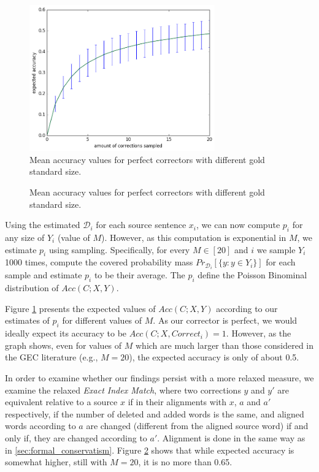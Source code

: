 \documentclass[english]{article}
\begin{document}
 \begin{figure}
   	\includegraphics[width=8cm]{exact__repeat_1000_accuracy}
 	\caption{Mean accuracy values for perfect correctors with different gold standard size.}
 	\label{fig:accuracy_vals}
 \end{figure}
 \begin{figure}
   \caption{Mean accuracy values for perfect correctors with different gold standard size.}
   \label{fig:accuracy_vals_ind}
 \end{figure}

 Using the estimated $\mathcal{D}_i$ for each source sentence $x_i$, we can now compute $p_i$ for any
 size of $Y_i$ (value of $M$). However, as this computation is exponential in $M$, we estimate $p_i$ using
 sampling. Specifically, for every $M\in[20]$ and $i$ we sample $Y_i$ 1000 times, compute 
 the covered probability mass $Pr_{\mathcal{D}_i}[\{y: y \in Y_i\}]$ for each sample and estimate $p_i$ to be their
 average. The $p_i$ define the Poisson Binominal distribution of $Acc(C;X,Y)$.

 Figure \ref{fig:accuracy_vals} presents the expected values of $Acc(C;X,Y)$ according to our estimates of $p_i$ for
 different values of $M$. As our corrector is perfect, we would ideally expect its accuracy to be
 $Acc(C;X,Correct_i) = 1$. However, as the graph shows, even for values of $M$ which are much larger than
 those considered in the GEC literature (e.g., $M=20$), the expected accuracy is only of about 0.5. 
 
 In order to examine whether our findings persist with a more relaxed measure, we examine the relaxed
 {\it Exact Index Match}, where two corrections $y$ and $y'$
 are equivalent relative to a source $x$ if in their alignments with $x$, $a$ and $a'$ respectively,
 if the number of deleted and added words is the same, and aligned words according to $a$ are
 changed (different from the aligned source word) if and only if, they are changed according to $a'$. Alignment is done in the same way as in \ref{sec:formal_conservatism}. Figure \ref{fig:accuracy_vals_ind}
 shows that while expected accuracy is somewhat higher, still with $M=20$, it is no more than 0.65.
 
\end{document}
